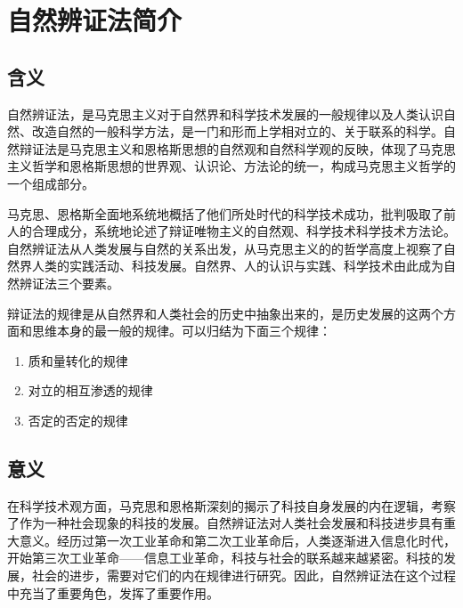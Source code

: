 \documentclass[a4paper,12pt]{report}
\begin{document}
\chapter{自然辨证法简介}
\setcounter{page}{1}
\begin{spacing}{1.5}
\songti{}

	\section{含义}
	自然辨证法，是马克思主义对于自然界和科学技术发展的一般规律以及人类认识自然、改造自然的一般科学方法，是一门和形而上学相对立的、关于联系的科学。自然辩证法是马克思主义和恩格斯思想的自然观和自然科学观的反映，体现了马克思主义哲学和恩格斯思想的世界观、认识论、方法论的统一，构成马克思主义哲学的一个组成部分\cite{zrbzf}。
	
	马克思、恩格斯全面地系统地概括了他们所处时代的科学技术成功，批判吸取了前人的合理成分，系统地论述了辩证唯物主义的自然观、科学技术科学技术方法论。自然辨证法从人类发展与自然的关系出发，从马克思主义的的哲学高度上视察了自然界人类的实践活动、科技发展。自然界、人的认识与实践、科学技术由此成为自然辨证法三个要素。
	
	辩证法的规律是从自然界和人类社会的历史中抽象出来的，是历史发展的这两个方面和思维本身的最一般的规律。可以归结为下面三个规律：
	\begin{enumerate}[(1)]
	\item 质和量转化的规律
	\item 对立的相互渗透的规律
	\item 否定的否定的规律
	\end{enumerate}
	
	\section{意义}
	在科学技术观方面，马克思和恩格斯深刻的揭示了科技自身发展的内在逻辑，考察了作为一种社会现象的科技的发展。自然辨证法对人类社会发展和科技进步具有重大意义。经历过第一次工业革命和第二次工业革命后，人类逐渐进入信息化时代，开始第三次工业革命——信息工业革命，科技与社会的联系越来越紧密。科技的发展，社会的进步，需要对它们的内在规律进行研究。因此，自然辨证法在这个过程中充当了重要角色，发挥了重要作用\cite{rq2013}。
	
\end{spacing}
\end{document}
